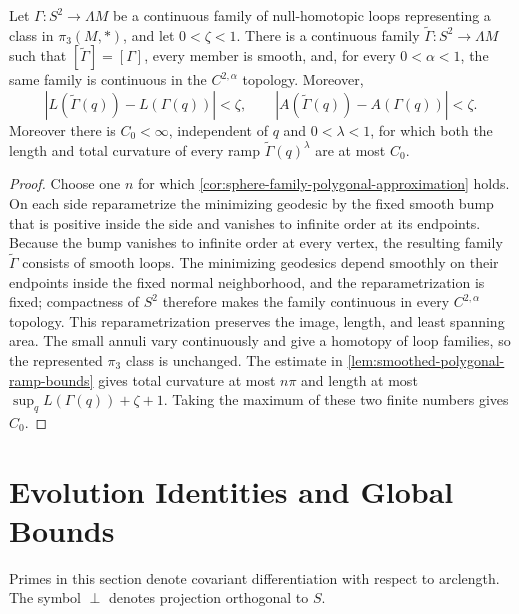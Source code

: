 \begin{theorem}
\label{thm:uniform-controlled-ramp-approximation}
\notready
Let $\Gamma\colon S^2\to\Lambda M$ be a continuous family of
null-homotopic loops representing a class in $\pi_3(M,*)$, and let
$0<\zeta<1$.  There is a continuous family
$\widetilde\Gamma\colon S^2\to\Lambda M$ such that
$[\widetilde\Gamma]=[\Gamma]$, every member is smooth, and, for every
$0<\alpha<1$, the same family is continuous in the $C^{2,\alpha}$ topology.
Moreover,
\[
 |L(\widetilde\Gamma(q))-L(\Gamma(q))|<\zeta,\qquad
 |A(\widetilde\Gamma(q))-A(\Gamma(q))|<\zeta.
\]
Moreover there is $C_0<\infty$, independent of $q$ and
$0<\lambda<1$, for which both the length and total curvature of every ramp
$\widetilde\Gamma(q)^\lambda$ are at most $C_0$.
\end{theorem}
\begin{proof}
Choose one $n$ for which
\ref{cor:sphere-family-polygonal-approximation} holds.  On each
side reparametrize the minimizing geodesic by the fixed smooth bump that is
positive inside the side and vanishes to infinite order at its endpoints.
Because the bump vanishes to infinite order at every vertex, the resulting
family $\widetilde\Gamma$ consists of smooth loops.  The minimizing geodesics
depend smoothly on their endpoints inside the fixed normal neighborhood, and
the reparametrization is fixed; compactness of $S^2$ therefore makes the
family continuous in every $C^{2,\alpha}$ topology.  This reparametrization
preserves the image, length, and least spanning area.
The small annuli vary continuously and give a homotopy of loop families, so
the represented $\pi_3$ class is unchanged.  The estimate in
\ref{lem:smoothed-polygonal-ramp-bounds} gives total curvature at most
$n\pi$ and length at most
$\sup_qL(\Gamma(q))+\zeta+1$.  Taking the maximum of these two finite
numbers gives $C_0$.
\end{proof}

\section{Evolution Identities and Global Bounds}

Primes in this section denote covariant differentiation with respect to
arclength.  The symbol $\perp$ denotes projection orthogonal to $S$.

